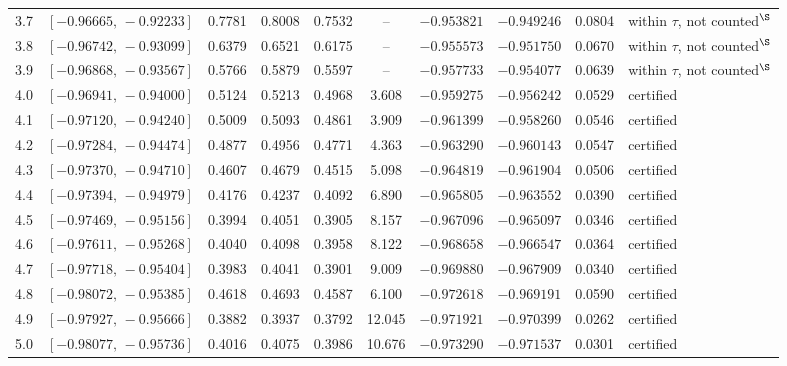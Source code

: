 {\begin{center}
\begin{tabular}{@{}lccccccccl@{}}
\rule[-3pt]{0pt}{11.5pt} 3.7 & $[-0.96665,\,-0.92233]$ & 0.7781 & 0.8008 & 0.7532 & -- & $-0.953821$ & $-0.949246$ & 0.0804 & within $\tau$, not counted$^{\S}$ \\
\rule[-3pt]{0pt}{11.5pt} 3.8 & $[-0.96742,\,-0.93099]$ & 0.6379 & 0.6521 & 0.6175 & -- & $-0.955573$ & $-0.951750$ & 0.0670 & within $\tau$, not counted$^{\S}$ \\
\rule[-3pt]{0pt}{11.5pt} 3.9 & $[-0.96868,\,-0.93567]$ & 0.5766 & 0.5879 & 0.5597 & -- & $-0.957733$ & $-0.954077$ & 0.0639 & within $\tau$, not counted$^{\S}$ \\
\rule[-3pt]{0pt}{11.5pt} 4.0 & $[-0.96941,\,-0.94000]$ & 0.5124 & 0.5213 & 0.4968 & 3.608 & $-0.959275$ & $-0.956242$ & 0.0529 & certified \\
\rule[-3pt]{0pt}{11.5pt} 4.1 & $[-0.97120,\,-0.94240]$ & 0.5009 & 0.5093 & 0.4861 & 3.909 & $-0.961399$ & $-0.958260$ & 0.0546 & certified \\
\rule[-3pt]{0pt}{11.5pt} 4.2 & $[-0.97284,\,-0.94474]$ & 0.4877 & 0.4956 & 0.4771 & 4.363 & $-0.963290$ & $-0.960143$ & 0.0547 & certified \\
\rule[-3pt]{0pt}{11.5pt} 4.3 & $[-0.97370,\,-0.94710]$ & 0.4607 & 0.4679 & 0.4515 & 5.098 & $-0.964819$ & $-0.961904$ & 0.0506 & certified \\
\rule[-3pt]{0pt}{11.5pt} 4.4 & $[-0.97394,\,-0.94979]$ & 0.4176 & 0.4237 & 0.4092 & 6.890 & $-0.965805$ & $-0.963552$ & 0.0390 & certified \\
\rule[-3pt]{0pt}{11.5pt} 4.5 & $[-0.97469,\,-0.95156]$ & 0.3994 & 0.4051 & 0.3905 & 8.157 & $-0.967096$ & $-0.965097$ & 0.0346 & certified \\
\rule[-3pt]{0pt}{11.5pt} 4.6 & $[-0.97611,\,-0.95268]$ & 0.4040 & 0.4098 & 0.3958 & 8.122 & $-0.968658$ & $-0.966547$ & 0.0364 & certified \\
\rule[-3pt]{0pt}{11.5pt} 4.7 & $[-0.97718,\,-0.95404]$ & 0.3983 & 0.4041 & 0.3901 & 9.009 & $-0.969880$ & $-0.967909$ & 0.0340 & certified \\
\rule[-3pt]{0pt}{11.5pt} 4.8 & $[-0.98072,\,-0.95385]$ & 0.4618 & 0.4693 & 0.4587 & 6.100 & $-0.972618$ & $-0.969191$ & 0.0590 & certified \\
\rule[-3pt]{0pt}{11.5pt} 4.9 & $[-0.97927,\,-0.95666]$ & 0.3882 & 0.3937 & 0.3792 & 12.045 & $-0.971921$ & $-0.970399$ & 0.0262 & certified \\
\rule[-3pt]{0pt}{11.5pt} 5.0 & $[-0.98077,\,-0.95736]$ & 0.4016 & 0.4075 & 0.3986 & 10.676 & $-0.973290$ & $-0.971537$ & 0.0301 & certified \\

\end{tabular}
\end{center}}
